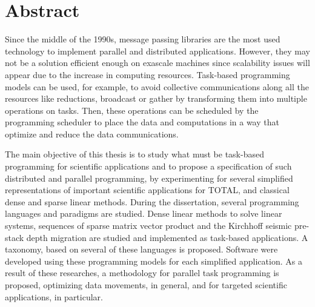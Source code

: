 \chapter*{Abstract}

Since the middle of the 1990s, message passing libraries are the most used technology to implement parallel and distributed applications.
However, they may not be a solution efficient enough on exascale machines since scalability issues will appear due to the increase in computing resources.
Task-based programming models can be used, for example, to avoid collective communications along all the resources like reductions, broadcast or gather by transforming them into multiple operations on tasks.
Then, these operations can be scheduled by the programming scheduler to place the data and computations in a way that optimize and reduce the data communications.

The main objective of this thesis is to study what must be task-based programming for scientific applications and to propose a specification of such distributed and parallel programming, by experimenting for several simplified representations of important scientific applications for TOTAL, and classical dense and sparse linear methods.
During the dissertation, several programming languages and paradigms are studied.
Dense linear methods to solve linear systems, sequences of sparse matrix vector product and the Kirchhoff seismic pre-stack depth migration are studied and implemented as task-based applications.
A taxonomy, based on several of these languages is proposed.
Software were developed using these programming models for each simplified application.
As a result of these researches, a methodology for parallel task programming is proposed, optimizing data movements, in general, and for targeted scientific applications, in particular.
